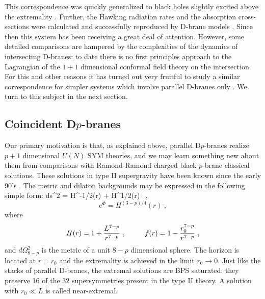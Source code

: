 \documentclass[12pt]{article}
\begin{document}
This correspondence was quickly generalized to black 
holes slightly excited above the extremality \cite{cm,HSS}. 
Further, the Hawking radiation rates and the absorption cross-sections
were calculated and successfully reproduced by D-brane models
\cite{cm,wad}.
Since then this system has been
receiving a great deal of attention.
However, some detailed comparisons are hampered by the complexities of the
dynamics of intersecting D-branes: to date there is no 
first principles approach to the Lagrangian of the $1+1$ dimensional 
conformal field theory on the intersection. 
For this and other reasons it has turned out 
very fruitful to study a similar correspondence
for simpler systems which involve parallel D-branes 
only \cite{gkp,ENT,kleb,gukt,gkThree}. We turn to this subject
in the next section.

\subsection{Coincident D$p$-branes}

Our primary motivation is that, as explained above, parallel
D$p$-branes realize $p+1$ dimensional $U(N)$ SYM theories, and we may
learn something new about them from comparisons with Ramond-Ramond
charged black $p$-brane
classical solutions. These solutions in type II supergravity have been
known since the early 90's \cite{hs,DL}.
The metric and dilaton backgrounds may be expressed in the following
simple form:
\be
\label{metric}
   ds^2 =
H^{-1/2}(r)
    \left[ - f(r) dt^2 + \sum_{i=1}^p (d x^i)^2 \right] +
H^{1/2}(r)
     \ ,
\ee
$$ e^\Phi = H^{(3-p)/4}(r)\ ,
$$
where
$$   H(r)  = 1 + {L^{7-p} \over r^{7-p}} \ , \qquad \  \  
f(r) = 1- {r_0^{7-p}\over
r^{7-p}}
\ ,
$$
and $d\Omega_{8-p}^2$ is the metric of a unit $8-p$ dimensional sphere.
The horizon is located at $r=r_0$ and the extremality
is achieved in the limit $r_0 \rightarrow 0$.
Just like the stacks of parallel D-branes, the extremal solutions are 
BPS saturated: they preserve 16 of the 32 supersymmetries present
in the type II theory. 
A solution with $r_0\ll L$ is called near-extremal.
\end{document}
